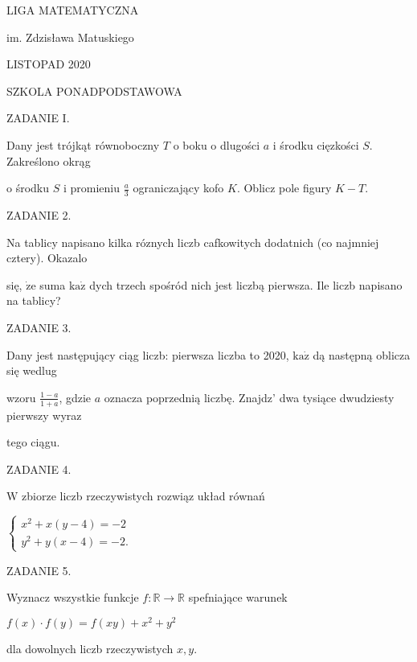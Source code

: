 \documentclass[a4paper,12pt]{article}
\begin{document}
LIGA MATEMATYCZNA

im. Zdzisława Matuskiego

LISTOPAD 2020

SZKOLA PONADPODSTAWOWA

ZADANIE I.

Dany jest trójkąt równoboczny $T$ o boku o dlugości $a$ i środku cięzkości $S$. Zakreślono okrąg

o środku $S$ i promieniu $\displaystyle \frac{a}{3}$ ograniczający kofo $K$. Oblicz pole figury $K-T.$

ZADANIE 2.

Na tablicy napisano kilka róznych liczb cafkowitych dodatnich (co najmniej cztery). Okazalo

się, $\dot{\mathrm{z}}\mathrm{e}$ suma $\mathrm{k}\mathrm{a}\dot{\mathrm{z}}$ dych trzech spośród nich jest liczbą pierwsza. Ile liczb napisano na tablicy?

ZADANIE 3.

Dany jest następujący ciąg liczb: pierwsza liczba to 2020, $\mathrm{k}\mathrm{a}\dot{\mathrm{z}}$ dą następną oblicza się wedlug

wzoru $\displaystyle \frac{1-a}{1+a}$, gdzie $a$ oznacza poprzednią liczbę. Znajdz' dwa tysiące dwudziesty pierwszy wyraz

tego ciągu.

ZADANIE 4.

$\mathrm{W}$ zbiorze liczb rzeczywistych rozwiąz układ równań

$\left\{\begin{array}{l}
x^{2}+x(y-4)=-2\\
y^{2}+y(x-4)=-2.
\end{array}\right.$

ZADANIE 5.

Wyznacz wszystkie funkcje $f:\mathbb{R}\rightarrow \mathbb{R}$ spefniające warunek

$f(x)\cdot f(y)=f(xy)+x^{2}+y^{2}$

dla dowolnych liczb rzeczywistych $x, y.$
\end{document}
